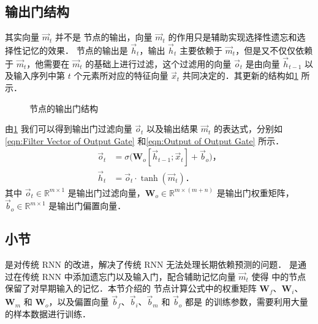 \subsection{\lstm{} 输出门结构}
其实向量 $\vec{m}_t$ 并不是 \lstm{} 节点的输出，向量 $\vec{m}_t$ 的作用只是辅助实现选择性遗忘和选择性记忆的效果．\lstm{} 节点的输出是 $\vec{h}_t$，输出 $\vec{h}_t$ 主要依赖于 $\vec{m}_t$，但是又不仅仅依赖于 $\vec{m}_t$，他需要在 $\vec{m}_t$ 的基础上进行过滤，这个过滤用的向量 $\vec{o}_t$ 是由向量 $\vec{h}_{t-1}$ 以及输入序列中第 $t$ 个元素所对应的特征向量 $\vec{x}_t$ 共同决定的．其更新的结构如\cref{fig:Cell Output of LSTM} 所示．%
%
\begin{figure}[!htb]
  \centering
  \scalebox{0.7}{}
  \caption{\lstm{} 节点的输出门结构}
  \label{fig:Cell Output of LSTM}
\end{figure}%
%
由\cref{fig:Cell Output of LSTM} 我们可以得到输出门过滤向量 $\vec{o}_t$ 以及输出结果 $\vec{m}_t$ 的表达式，分别如\cref{eqn:Filter Vector of Output Gate} 和\cref{eqn:Output of Output Gate} 所示．%
%
\begin{align}
  \label{eqn:Filter Vector of Output Gate}
  \vec{o}_t &= \sigma\big(\bm{W}_o[\vec{h}_{t-1};\vec{x}_t] + \vec{b}_o\big)\text{，}\\
  \label{eqn:Output of Output Gate}
  \vec{h}_t &= \vec{o}_t\cdot\tanh(\vec{m}_t)\text{．}
\end{align}%
%
其中 $\vec{o}_t\in\mathbb{R}^{m\times 1}$ 是输出门过滤向量，$\bm{W}_o\in\mathbb{R}^{m\times (m+n)}$ 是输出门权重矩阵，$\vec{b}_o\in\mathbb{R}^{m\times 1}$ 是输出门偏置向量．

\subsection{小节}
\indent\lstm{} 是对传统 RNN 的改进，解决了传统 RNN 无法处理长期依赖预测的问题．\lstm{} 是通过在传统 RNN 中添加遗忘门以及输入门，配合辅助记忆向量 $\vec{m}_t$ 使得 \lstm{} 中的节点保留了对早期输入的记忆．本节介绍的 \lstm{} 节点计算公式中的权重矩阵 $\bm{W}_f$、$\bm{W}_i$、$\bm{W}_m$ 和 $\bm{W}_o$，以及偏置向量 $\vec{b}_f$、$\vec{b}_i$、$\vec{b}_m$ 和 $\vec{b}_o$ 都是 \lstm{} 的训练参数，需要利用大量的样本数据进行训练．